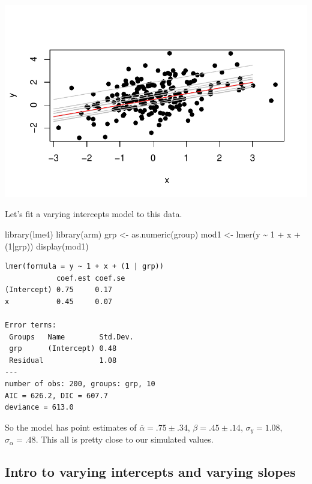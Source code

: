 \documentclass[
  letterpaper,
  DIV=11,
  numbers=noendperiod]{scrartcl}
\newenvironment{Shaded}{\begin{snugshade}}{\end{snugshade}}
\newcommand{\DecValTok}[1]{\textcolor[rgb]{0.68,0.00,0.00}{#1}}
\newcommand{\FunctionTok}[1]{\textcolor[rgb]{0.28,0.35,0.67}{#1}}
\newcommand{\NormalTok}[1]{\textcolor[rgb]{0.00,0.23,0.31}{#1}}
\newcommand{\OtherTok}[1]{\textcolor[rgb]{0.00,0.23,0.31}{#1}}
\newcommand{\SpecialCharTok}[1]{\textcolor[rgb]{0.37,0.37,0.37}{#1}}
\begin{document}
\includegraphics{varying_intercepts_varying_slopes_files/figure-pdf/unnamed-chunk-1-1.pdf}

Let's fit a varying intercepts model to this data.

\begin{Shaded}
\begin{Highlighting}[]
\FunctionTok{library}\NormalTok{(lme4)}
\FunctionTok{library}\NormalTok{(arm)}
\NormalTok{grp }\OtherTok{\textless{}{-}} \FunctionTok{as.numeric}\NormalTok{(group)}
\NormalTok{mod1 }\OtherTok{\textless{}{-}} \FunctionTok{lmer}\NormalTok{(y }\SpecialCharTok{\textasciitilde{}} \DecValTok{1} \SpecialCharTok{+}\NormalTok{ x }\SpecialCharTok{+}\NormalTok{ (}\DecValTok{1}\SpecialCharTok{|}\NormalTok{grp))}
\FunctionTok{display}\NormalTok{(mod1)}
\end{Highlighting}
\end{Shaded}

\begin{verbatim}
lmer(formula = y ~ 1 + x + (1 | grp))
            coef.est coef.se
(Intercept) 0.75     0.17   
x           0.45     0.07   

Error terms:
 Groups   Name        Std.Dev.
 grp      (Intercept) 0.48    
 Residual             1.08    
---
number of obs: 200, groups: grp, 10
AIC = 626.2, DIC = 607.7
deviance = 613.0 
\end{verbatim}

So the model has point estimates of \(\overline{\alpha} = .75 \pm .34\),
\(\beta = .45 \pm .14\), \(\sigma_y = 1.08\), \(\sigma_{\alpha} = .48\).
This all is pretty close to our simulated values.

\subsection{Intro to varying intercepts and varying
slopes}\label{intro-to-varying-intercepts-and-varying-slopes}
\end{document}
